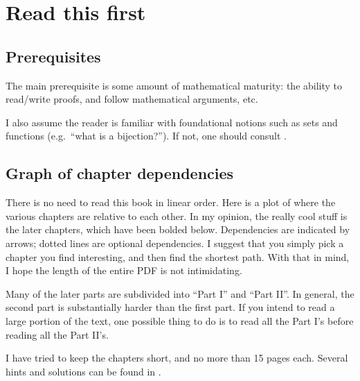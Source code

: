 \addtocounter{chapter}{-1}
\chapter{Read this first}
\section{Prerequisites}
The main prerequisite is some amount of mathematical maturity:
the ability to read/write proofs, and follow mathematical arguments, etc.

I also assume the reader is familiar with foundational notions such
as sets and functions (e.g.\ ``what is a bijection?'').
If not, one should consult .

\section{Graph of chapter dependencies}
There is no need to read this book in linear order.
Here is a plot of where the various chapters are relative to each other.
In my opinion, the really cool stuff is the later chapters,
which have been bolded below.
Dependencies are indicated by arrows;
dotted lines are optional dependencies.
I suggest that you simply pick a chapter you find interesting,
and then find the shortest path.
With that in mind, I hope the length of the entire PDF is not intimidating.

Many of the later parts are subdivided into ``Part I'' and ``Part II''.
In general, the second part is substantially harder than the first part.
If you intend to read a large portion of the text,
one possible thing to do is to read all the Part I's
before reading all the Part II's.

I have tried to keep the chapters short, and no more than 15 pages each.
Several hints and solutions can be found in .




